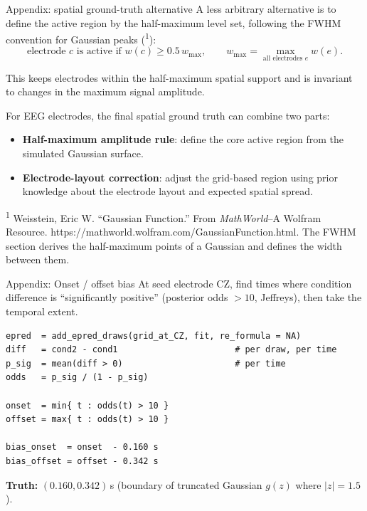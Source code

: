 \documentclass{beamer}
\begin{document}
\begin{frame}{Appendix: spatial ground-truth alternative}
\small
A less arbitrary alternative is to define the active region by the
half-maximum level set, following the FWHM convention for Gaussian peaks
(\textsuperscript{1}):
\[
\text{electrode } c \text{ is active if } w(c) \geq 0.5\,w_{\max},
\qquad
w_{\max} = \max_{\text{all electrodes } e} w(e).
\]

\medskip
This keeps electrodes within the half-maximum spatial support and is invariant
to changes in the maximum signal amplitude.

\medskip
For EEG electrodes, the final spatial ground truth can combine two parts:
\begin{itemize}\small
\item \textbf{Half-maximum amplitude rule}: define the core active region from
the simulated Gaussian surface.
\item \textbf{Electrode-layout correction}: adjust the grid-based region using
prior knowledge about the electrode layout and expected spatial spread.
\end{itemize}

\vfill
\tiny \textsuperscript{1} Weisstein, Eric W. ``Gaussian Function.''
From \textit{MathWorld}--A Wolfram Resource.
https://mathworld.wolfram.com/GaussianFunction.html. The FWHM section derives
the half-maximum points of a Gaussian and defines the width between them.
\end{frame}

\begin{frame}[fragile]{Appendix: Onset / offset bias}
\small
At seed electrode CZ, find times where condition difference is
``significantly positive'' (posterior odds $> 10$, Jeffreys),
then take the temporal extent.

\medskip
\scriptsize
\begin{verbatim}
epred  = add_epred_draws(grid_at_CZ, fit, re_formula = NA)
diff   = cond2 - cond1                       # per draw, per time
p_sig  = mean(diff > 0)                      # per time
odds   = p_sig / (1 - p_sig)

onset  = min{ t : odds(t) > 10 }
offset = max{ t : odds(t) > 10 }

bias_onset  = onset  - 0.160 s
bias_offset = offset - 0.342 s
\end{verbatim}

\smallskip
\textbf{Truth:} $(0.160, 0.342)$\,s (boundary of truncated Gaussian
$g(z)$ where $|z| = 1.5$).
\end{frame}
\end{document}
